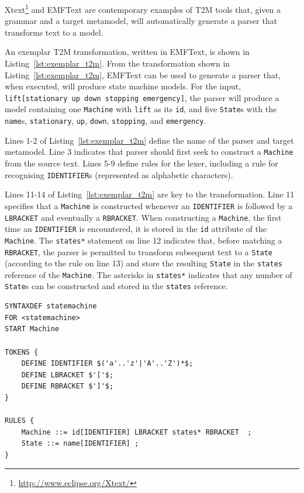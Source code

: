 Xtext\footnote{\url{http://www.eclipse.org/Xtext/}} and EMFText \cite{heidenreich09derivation} are contemporary examples of T2M tools that, given a grammar and a target metamodel, will automatically generate a parser that transforms text to a model.

An exemplar T2M transformation, written in EMFText, is shown in Listing~\ref{lst:exemplar_t2m}. From the transformation shown in Listing~\ref{lst:exemplar_t2m}, EMFText can be used to generate a parser that, when executed, will produce state machine models. For the input, \texttt{lift[stationary up down stopping emergency]}, the pa\-rser will produce a model containing one \texttt{Machine} with \texttt{lift} as its \texttt{id}, and five \texttt{State}s with the \texttt{name}s, \texttt{stationary}, \texttt{up}, \texttt{down}, \texttt{stopping}, and \texttt{em\-er\-ge\-ncy}.

Lines 1-2 of Listing~\ref{lst:exemplar_t2m} define the name of the parser and target metamodel. Line 3 indicates that parser should first seek to construct a \texttt{Machine} from the source text. Lines 5-9 define rules for the lexer, including a rule for recognising \texttt{IDENTIFIER}s (represented as alphabetic characters).

Lines 11-14 of Listing~\ref{lst:exemplar_t2m} are key to the transformation. Line 11 specifies that a \texttt{Machine} is constructed whenever an \texttt{IDENTIFIER} is followed by a \texttt{LBRACKET} and eventually a \texttt{RBRACKET}. When constructing a \texttt{Machine}, the first time an \texttt{IDENTIFIER} is encountered, it is stored in the \texttt{id} attribute of the \texttt{Machine}. The \texttt{states*} statement on line 12 indicates that, before matching a \texttt{RBRACKET}, the parser is permitted to transform subsequent text to a \texttt{State} (according to the rule on line 13) and store the resulting \texttt{State} in the \texttt{states} reference of the \texttt{Machine}. The asterisks in \texttt{states*} indicates that any number of \texttt{State}s can be constructed and stored in the \texttt{states} reference.

\begin{lstlisting}[caption=T2M transformation in EMFText, label=lst:exemplar_t2m, language=EMFText, escapechar={}]
SYNTAXDEF statemachine
FOR <statemachine>
START Machine

TOKENS {
	DEFINE IDENTIFIER $('a'..'z'|'A'..'Z')*$;
	DEFINE LBRACKET $'['$;
	DEFINE RBRACKET $']'$;
}

RULES {
	Machine ::= id[IDENTIFIER] LBRACKET states* RBRACKET  ;
	State ::= name[IDENTIFIER] ;
}
\end{lstlisting}

